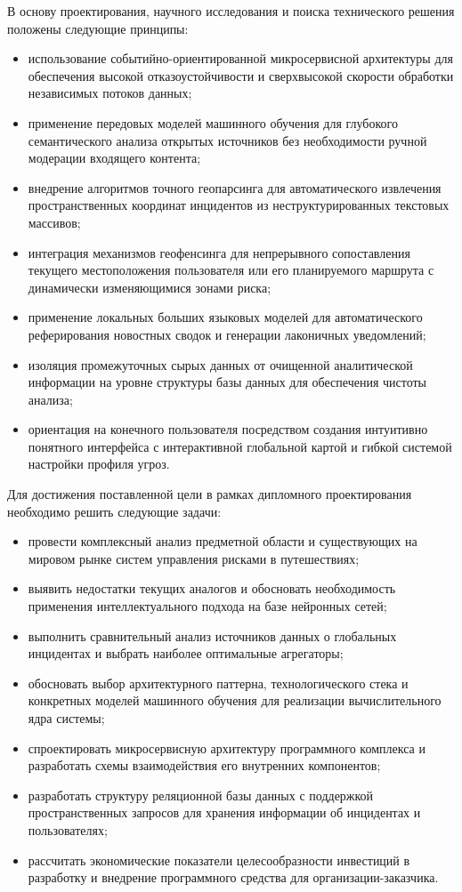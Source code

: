 В основу проектирования, научного исследования и поиска технического решения положены следующие принципы:
\begin{itemize}
\item использование событийно-ориентированной микросервисной архитектуры для обеспечения высокой отказоустойчивости и сверхвысокой скорости обработки независимых потоков данных;
\item применение передовых моделей машинного обучения для глубокого семантического анализа открытых источников без необходимости ручной модерации входящего контента;
\item внедрение алгоритмов точного геопарсинга для автоматического извлечения пространственных координат инцидентов из неструктурированных текстовых массивов;
\item интеграция механизмов геофенсинга для непрерывного сопоставления текущего местоположения пользователя или его планируемого маршрута с динамически изменяющимися зонами риска;
\item применение локальных больших языковых моделей для автоматического реферирования новостных сводок и генерации лаконичных уведомлений;
\item изоляция промежуточных сырых данных от очищенной аналитической информации на уровне структуры базы данных для обеспечения чистоты анализа;
\item ориентация на конечного пользователя посредством создания интуитивно понятного интерфейса с интерактивной глобальной картой и гибкой системой настройки профиля угроз.
\end{itemize}

Для достижения поставленной цели в рамках дипломного проектирования необходимо решить следующие задачи:
\begin{itemize}
\item провести комплексный анализ предметной области и существующих на мировом рынке систем управления рисками в путешествиях;
\item выявить недостатки текущих аналогов и обосновать необходимость применения интеллектуального подхода на базе нейронных сетей;
\item выполнить сравнительный анализ источников данных о глобальных инцидентах и выбрать наиболее оптимальные агрегаторы;
\item обосновать выбор архитектурного паттерна, технологического стека и конкретных моделей машинного обучения для реализации вычислительного ядра системы;
\item спроектировать микросервисную архитектуру программного комплекса и разработать схемы взаимодействия его внутренних компонентов;
\item разработать структуру реляционной базы данных с поддержкой пространственных запросов для хранения информации об инцидентах и пользователях;
\item рассчитать экономические показатели целесообразности инвестиций в разработку и внедрение программного средства для организации-заказчика.
\end{itemize}

